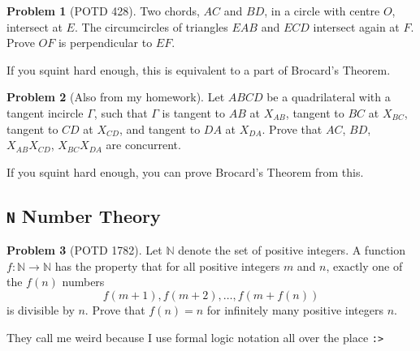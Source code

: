 \documentclass[11pt]{article} %
\theoremstyle{definition}
\newtheorem{problem}{Problem}
\theoremstyle{remark}
\begin{document}
\begin{problem}[POTD 428]
    Two chords, \(A C\) and \(B D\), in a circle with centre \(O\), intersect at \(E .\) The circumcircles of triangles \(E A B\) and \(E C D\) intersect again at \(F .\) Prove \(O F\) is perpendicular to \(E F\).
    \begin{talks}
        \begin{talk}
            If you squint hard enough, this is equivalent to a part of Brocard's Theorem.
        \end{talk}
    \end{talks}
\end{problem}

\begin{problem}[Also from my homework]
    Let \(ABCD\) be a quadrilateral with a tangent incircle \(\Gamma\), such that \(\Gamma\) is tangent to \(AB\) at \(X_{AB}\), tangent to \(BC\) at \(X_{BC}\), tangent to \(CD\) at \(X_{CD}\), and tangent to \(DA\) at \(X_{DA}\). Prove that \(AC\), \(BD\), \(X_{AB} X_{CD}\), \(X_{BC} X_{DA}\) are concurrent.
    \begin{talks}
        \begin{talk}
            If you squint hard enough, you can prove Brocard's Theorem from this.
        \end{talk}
    \end{talks}
\end{problem}

\subsection{\texttt{N} Number Theory}
\setcounter{problem}{0}

\begin{problem}[POTD 1782]
    Let \(\mathbb N\) denote the set of positive integers. A function \(f\colon\mathbb N\to\mathbb N\) has the property that for all positive integers \(m\) and \(n\), exactly one of the \(f(n)\) numbers
    \[f(m+1),f(m+2),\ldots,f(m+f(n))\]is divisible by \(n\). Prove that \(f(n)=n\) for infinitely many positive integers \(n\).
    \begin{talks}
        \begin{talk}
            They call me weird because I use formal logic notation all over the place \texttt{:>}
        \end{talk}
    \end{talks}
\end{problem}
\end{document}
